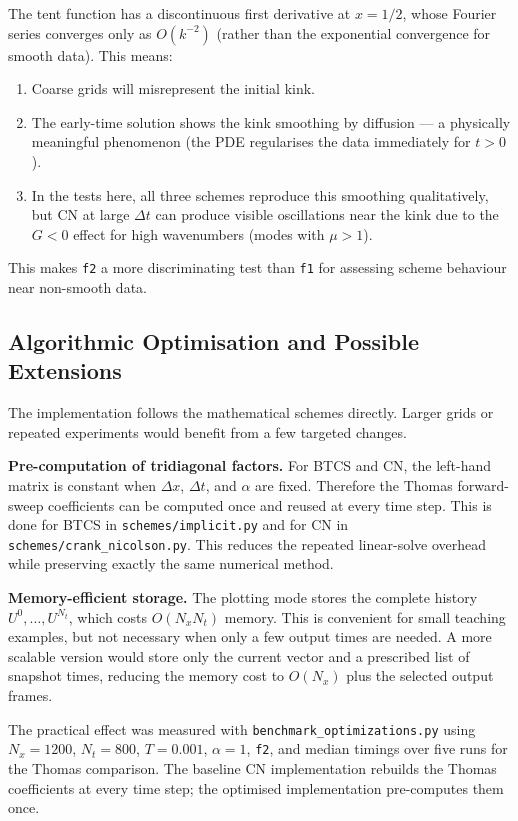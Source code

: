 \documentclass[11pt,a4paper]{article}
\begin{document}
The tent function has a discontinuous first derivative at $x = 1/2$, whose Fourier series converges only as $O(k^{-2})$ (rather than the exponential convergence for smooth data). This means:

\begin{enumerate}
\item Coarse grids will misrepresent the initial kink.
\item The early-time solution shows the kink smoothing by diffusion — a physically meaningful phenomenon (the PDE regularises the data immediately for $t > 0$).
\item In the tests here, all three schemes reproduce this smoothing qualitatively, but CN at large $\Delta t$ can produce visible oscillations near the kink due to the $G < 0$ effect for high wavenumbers (modes with $\mu > 1$).
\end{enumerate}

This makes \texttt{f2} a more discriminating test than \texttt{f1} for assessing scheme behaviour near non-smooth data.

\subsection{Algorithmic Optimisation and Possible Extensions}

The implementation follows the mathematical schemes directly. Larger grids or repeated experiments would benefit from a few targeted changes.

\textbf{Pre-computation of tridiagonal factors.} For BTCS and CN, the left-hand matrix is constant when $\Delta x$, $\Delta t$, and $\alpha$ are fixed. Therefore the Thomas forward-sweep coefficients can be computed once and reused at every time step. This is done for BTCS in \texttt{schemes/implicit.py} and for CN in \texttt{schemes/crank\_nicolson.py}. This reduces the repeated linear-solve overhead while preserving exactly the same numerical method.

\textbf{Memory-efficient storage.} The plotting mode stores the complete history $U^0,\ldots,U^{N_t}$, which costs $O(N_xN_t)$ memory. This is convenient for small teaching examples, but not necessary when only a few output times are needed. A more scalable version would store only the current vector and a prescribed list of snapshot times, reducing the memory cost to $O(N_x)$ plus the selected output frames.

The practical effect was measured with \texttt{benchmark\_optimizations.py} using $N_x=1200$, $N_t=800$, $T=0.001$, $\alpha=1$, \texttt{f2}, and median timings over five runs for the Thomas comparison. The baseline CN implementation rebuilds the Thomas coefficients at every time step; the optimised implementation pre-computes them once.
\end{document}
